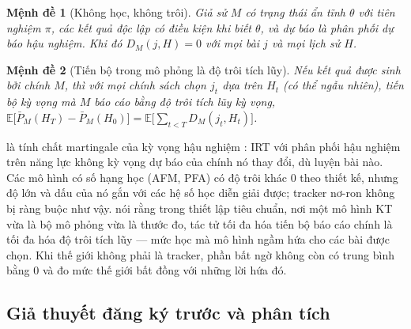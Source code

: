 \documentclass[a4paper,preprint,12pt,authoryear]{elsarticle}
\newtheorem{proposition}{Mệnh đề}
\begin{document}
\begin{proposition}[Không học, không trôi]\label{prop:nodrift}
Giả sử $M$ có trạng thái ẩn tĩnh $\theta$ với tiên nghiệm $\pi$, các kết quả độc lập có điều kiện khi biết $\theta$, và dự báo là phân phối dự báo hậu nghiệm. Khi đó $D_M(j,H)=0$ với mọi bài $j$ và mọi lịch sử $H$.
\end{proposition}

\begin{proposition}[Tiến bộ trong mô phỏng là độ trôi tích lũy]\label{prop:insim}
Nếu kết quả được sinh bởi chính $M$, thì với mọi chính sách chọn $j_t$ dựa trên $H_t$ (có thể ngẫu nhiên), tiến bộ kỳ vọng mà $M$ báo cáo bằng độ trôi tích lũy kỳ vọng, $\mathbb E\bigl[\bar P_M(H_T)-\bar P_M(H_0)\bigr] = \mathbb E\bigl[\sum_{t<T} D_M(j_t,H_t)\bigr]$.
\end{proposition}

 là tính chất martingale của kỳ vọng hậu nghiệm \citep{williams1991probability}: IRT với phân phối hậu nghiệm trên năng lực không kỳ vọng dự báo của chính nó thay đổi, dù luyện bài nào. Các mô hình có số hạng học (AFM, PFA) có độ trôi khác 0 theo thiết kế, nhưng độ lớn và dấu của nó gắn với các hệ số học diễn giải được; tracker nơ-ron không bị ràng buộc như vậy.  nói rằng trong thiết lập tiêu chuẩn, nơi một mô hình KT vừa là bộ mô phỏng vừa là thước đo, tác tử tối đa hóa tiến bộ báo cáo chính là tối đa hóa độ trôi tích lũy — mức học mà mô hình ngầm hứa cho các bài được chọn. Khi thế giới không phải là tracker, phần bất ngờ không còn có trung bình bằng 0 và đo mức thế giới bất đồng với những lời hứa đó.

\subsection{Giả thuyết đăng ký trước và phân tích}\label{sec:protocol}
\end{document}
